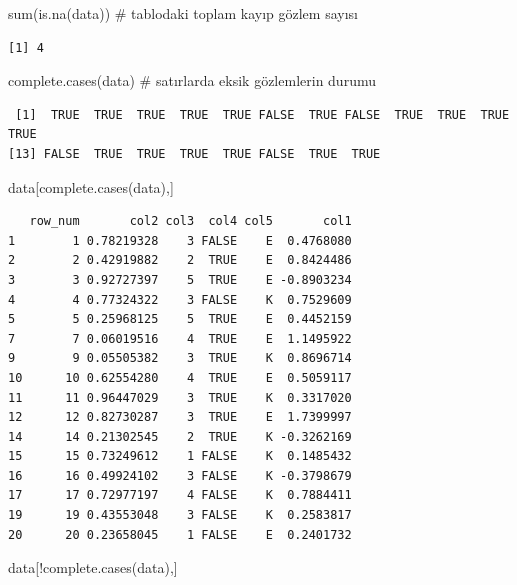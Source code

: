 \documentclass[
  letterpaper,
  DIV=11,
  numbers=noendperiod]{scrreprt}
\newenvironment{Shaded}{\begin{snugshade}}{\end{snugshade}}
\newcommand{\CommentTok}[1]{\textcolor[rgb]{0.37,0.37,0.37}{#1}}
\newcommand{\FunctionTok}[1]{\textcolor[rgb]{0.28,0.35,0.67}{#1}}
\newcommand{\NormalTok}[1]{\textcolor[rgb]{0.00,0.23,0.31}{#1}}
\newcommand{\SpecialCharTok}[1]{\textcolor[rgb]{0.37,0.37,0.37}{#1}}
\begin{document}
\begin{Shaded}
\begin{Highlighting}[]
\FunctionTok{sum}\NormalTok{(}\FunctionTok{is.na}\NormalTok{(data)) }\CommentTok{\# tablodaki toplam kayıp gözlem sayısı}
\end{Highlighting}
\end{Shaded}

\begin{verbatim}
[1] 4
\end{verbatim}

\begin{Shaded}
\begin{Highlighting}[]
\FunctionTok{complete.cases}\NormalTok{(data) }\CommentTok{\# satırlarda eksik gözlemlerin durumu}
\end{Highlighting}
\end{Shaded}

\begin{verbatim}
 [1]  TRUE  TRUE  TRUE  TRUE  TRUE FALSE  TRUE FALSE  TRUE  TRUE  TRUE  TRUE
[13] FALSE  TRUE  TRUE  TRUE  TRUE FALSE  TRUE  TRUE
\end{verbatim}

\begin{Shaded}
\begin{Highlighting}[]
\NormalTok{data[}\FunctionTok{complete.cases}\NormalTok{(data),]}
\end{Highlighting}
\end{Shaded}

\begin{verbatim}
   row_num       col2 col3  col4 col5       col1
1        1 0.78219328    3 FALSE    E  0.4768080
2        2 0.42919882    2  TRUE    E  0.8424486
3        3 0.92727397    5  TRUE    E -0.8903234
4        4 0.77324322    3 FALSE    K  0.7529609
5        5 0.25968125    5  TRUE    E  0.4452159
7        7 0.06019516    4  TRUE    E  1.1495922
9        9 0.05505382    3  TRUE    K  0.8696714
10      10 0.62554280    4  TRUE    E  0.5059117
11      11 0.96447029    3  TRUE    K  0.3317020
12      12 0.82730287    3  TRUE    E  1.7399997
14      14 0.21302545    2  TRUE    K -0.3262169
15      15 0.73249612    1 FALSE    K  0.1485432
16      16 0.49924102    3 FALSE    K -0.3798679
17      17 0.72977197    4 FALSE    K  0.7884411
19      19 0.43553048    3 FALSE    K  0.2583817
20      20 0.23658045    1 FALSE    E  0.2401732
\end{verbatim}

\begin{Shaded}
\begin{Highlighting}[]
\NormalTok{data[}\SpecialCharTok{!}\FunctionTok{complete.cases}\NormalTok{(data),]}
\end{Highlighting}
\end{Shaded}
\end{document}

